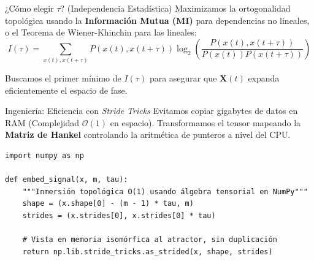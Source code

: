\documentclass[10pt, aspectratio=169]{beamer} %
\begin{document}
\begin{frame}{¿Cómo elegir $\tau$? (Independencia Estadística)}
    Maximizamos la ortogonalidad topológica usando la \textbf{Información Mutua (MI)} para dependencias no lineales, o el Teorema de Wiener-Khinchin para las lineales:
    \begin{equation*}
        I(\tau) = \sum_{x(t),x(t+\tau)} P(x(t), x(t+\tau)) \log_2 \left( \frac{P(x(t), x(t+\tau))}{P(x(t))P(x(t+\tau))} \right)
    \end{equation*}
    
    \centering
    
    \small Buscamos el primer mínimo de $I(\tau)$ para asegurar que $\mathbf{X}(t)$ expanda eficientemente el espacio de fase.
\end{frame}

\begin{frame}[fragile]{Ingeniería: Eficiencia con \textit{Stride Tricks}}
    Evitamos copiar gigabytes de datos en RAM (Complejidad $\mathcal{O}(1)$ en espacio). Transformamos el tensor mapeando la \textbf{Matriz de Hankel} controlando la aritmética de punteros a nivel del CPU.
    
    \vspace{0.3cm}
    \begin{lstlisting}
import numpy as np

def embed_signal(x, m, tau):
    """Inmersión topológica O(1) usando álgebra tensorial en NumPy"""
    shape = (x.shape[0] - (m - 1) * tau, m)
    strides = (x.strides[0], x.strides[0] * tau)
    
    # Vista en memoria isomórfica al atractor, sin duplicación
    return np.lib.stride_tricks.as_strided(x, shape, strides)
    \end{lstlisting}
\end{frame}
\end{document}
